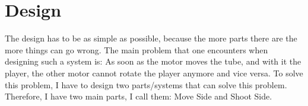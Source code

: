 \section{Design}\label{sec:design}
The design has to be as simple as possible, because the more parts there are the more things can go wrong.
The main problem that one encounters when designing such a system is:
As soon as the motor moves the tube, and with it the player, the other motor cannot rotate the player anymore and vice versa.
To solve this problem, I have to design two parts/systems that can solve this problem.
Therefore, I have two main parts, I call them: Move Side and Shoot Side.

